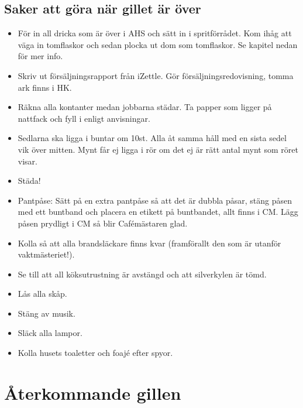 \documentclass[10pt]{article}
\begin{document}
    \subsection{Saker att göra när gillet är över}
    \begin{itemize}
        \item För in all dricka som är över i AHS och sätt in i spritförrådet. Kom ihåg att väga in tomflaskor och sedan plocka ut dom som tomflaskor. Se kapitel nedan för mer info.
        \item Skriv ut försäljningsrapport från iZettle. Gör försäljningsredovisning, tomma ark finns i HK.
        \item Räkna alla kontanter medan jobbarna städar. Ta papper som ligger på nattfack och fyll i enligt anvisningar.
        \item Sedlarna ska ligga i buntar om 10st. Alla åt samma håll med en sista sedel vik över mitten. Mynt får ej ligga i rör om det ej är rätt antal mynt som röret visar.
        \item Städa!
        \item Pantpåse: Sätt på en extra pantpåse så att det är dubbla påsar, stäng påsen med ett buntband och placera en etikett på buntbandet, allt finns i CM. Lägg påsen prydligt i CM så blir Cafémästaren glad.
        \item Kolla så att alla brandsläckare finns kvar (framförallt den som är utanför vaktmästeriet!).
        \item Se till att all köksutrustning är avstängd och att silverkylen är tömd.
        \item Lås alla skåp.
        \item Stäng av musik.
        \item Släck alla lampor.
        \item Kolla husets toaletter och foajé efter spyor.

    \end{itemize}


\section{Återkommande gillen}
\end{document}
